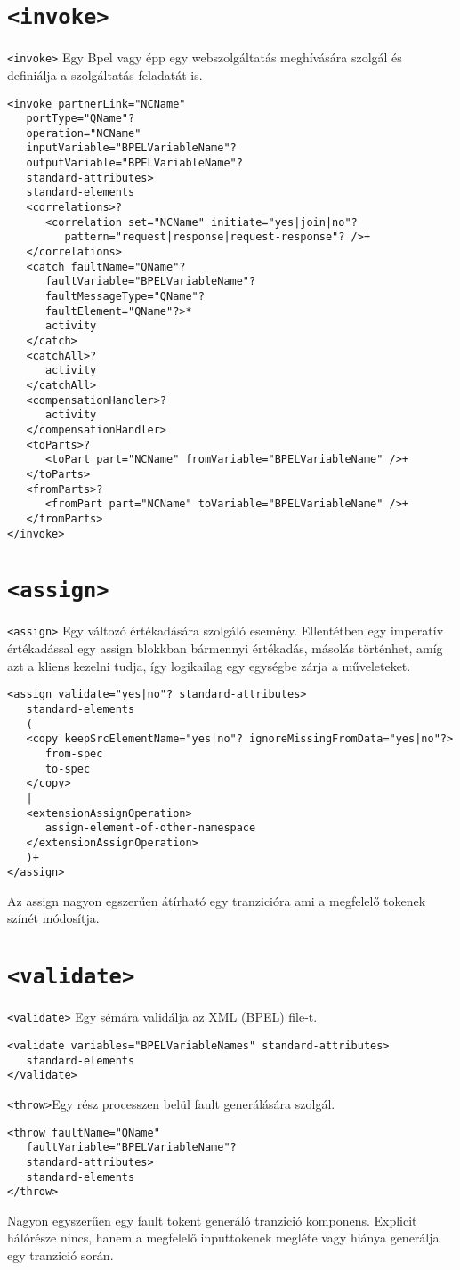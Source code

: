 \section{\texttt{<invoke>}}
\texttt{<invoke>} Egy Bpel vagy épp egy webszolgáltatás meghívására szolgál és definiálja a szolgáltatás feladatát is. 
\begin{verbatim}
<invoke partnerLink="NCName"
   portType="QName"?
   operation="NCName"
   inputVariable="BPELVariableName"?
   outputVariable="BPELVariableName"?
   standard-attributes>
   standard-elements
   <correlations>?
      <correlation set="NCName" initiate="yes|join|no"?
         pattern="request|response|request-response"? />+
   </correlations>
   <catch faultName="QName"?
      faultVariable="BPELVariableName"?
      faultMessageType="QName"?
      faultElement="QName"?>*
      activity
   </catch>
   <catchAll>?
      activity
   </catchAll>
   <compensationHandler>?
      activity
   </compensationHandler>
   <toParts>?
      <toPart part="NCName" fromVariable="BPELVariableName" />+
   </toParts>
   <fromParts>?
      <fromPart part="NCName" toVariable="BPELVariableName" />+
   </fromParts>
</invoke>
\end{verbatim}

\section{\texttt{<assign>}}
\texttt{<assign>} Egy változó értékadására szolgáló esemény. Ellentétben egy imperatív értékadással egy assign blokkban bármennyi értékadás, másolás történhet, amíg azt a kliens kezelni tudja, így logikailag egy egységbe zárja a műveleteket.  
\begin{verbatim}
<assign validate="yes|no"? standard-attributes>
   standard-elements
   (
   <copy keepSrcElementName="yes|no"? ignoreMissingFromData="yes|no"?>
      from-spec
      to-spec
   </copy>
   |
   <extensionAssignOperation>
      assign-element-of-other-namespace
   </extensionAssignOperation>
   )+
</assign>
\end{verbatim}
Az assign nagyon egszerűen átírható egy tranzicióra ami a megfelelő tokenek színét módosítja. 

\section{\texttt{<validate>}}
\texttt{<validate>} Egy sémára validálja az XML (BPEL) file-t. 
\begin{verbatim}
<validate variables="BPELVariableNames" standard-attributes>
   standard-elements
</validate>
\end{verbatim}
\texttt{<throw>}Egy rész processzen belül fault generálására szolgál. 
\begin{verbatim}
<throw faultName="QName"
   faultVariable="BPELVariableName"?
   standard-attributes>
   standard-elements
</throw>
\end{verbatim}
Nagyon egyszerűen egy fault tokent generáló tranzició komponens. Explicit hálórésze nincs, hanem a megfelelő inputtokenek megléte vagy hiánya generálja egy tranzició során. 

